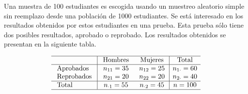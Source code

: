 \addpoints

\question[30] Una muestra de 100 estudiantes es escogida usando un muestreo aleatorio simple sin reemplazo desde una población de 1000 estudiantes. Se está interesado en los resultados obtenidos por estos estudiantes en una prueba. Esta prueba sólo tiene dos posibles resultados, aprobado o reprobado. Los resultados obtenidos se presentan en la siguiente tabla.

$$\begin{array}{l|cc|c}
\hline & \text { Hombres } & \text { Mujeres } & \text { Total } \\
\hline \text { Aprobados } & n_{11}=35 & n_{12}=25 & n_{1 \cdot}=60 \\
\text { Reprobados } & n_{21}=20 & n_{22}=20 & n_{2 \cdot}=40 \\
\hline \text { Total } & n_{\cdot 1}=55 & n_{\cdot 2}=45 & n=100 \\
\hline
\end{array}$$

